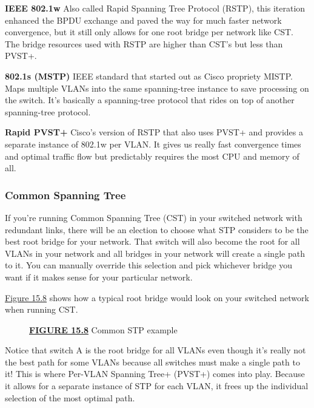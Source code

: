 \textbf{IEEE 802.1w} Also called Rapid Spanning Tree Protocol (RSTP),
this iteration enhanced the BPDU exchange and paved the way for much
faster network convergence, but it still only allows for one root bridge
per network like CST. The bridge resources used with RSTP are higher
than CST's but less than PVST+.

\textbf{802.1s (MSTP)} IEEE standard that started out as Cisco propriety
MISTP. Maps multiple VLANs into the same spanning-tree instance to save
processing on the switch. It's basically a spanning-tree protocol that
rides on top of another spanning-tree protocol.

\textbf{Rapid PVST+} Cisco's version of RSTP that also uses PVST+ and
provides a separate instance of 802.1w per VLAN. It gives us really fast
convergence times and optimal traffic flow but predictably requires the
most CPU and memory of all.

\subsubsection[Common Spanning
Tree]{\texorpdfstring{\protect\hypertarget{c15.xhtmlux5cux23c15-sec-13}{}{}Common
Spanning Tree}{Common Spanning Tree}}

If you're running Common Spanning Tree (CST) in your switched network
with redundant links, there will be an election to choose what STP
considers to be the best root bridge for your network. That switch will
also become the root for all VLANs in your network and all bridges in
your network will create a single path to it. You can manually override
this selection and pick whichever bridge you want if it makes sense for
your particular network.

\protect\hyperlink{c15.xhtmlux5cux23figure15-8}{Figure
15.8} shows how a typical root bridge would look on your switched
network when running CST.

\begin{figure}
\centering
\caption{{\protect\hyperlink{c15.xhtmlux5cux23figureanchor15-8}{\textbf{FIGURE
15.8}} Common STP example}}
\end{figure}

Notice that switch A is the root bridge for all VLANs even though it's
really not the best path for some VLANs because all switches must make a
single path to it! This is where Per-VLAN Spanning Tree+ (PVST+) comes
into play. Because it allows for a separate instance of STP for each
VLAN, it frees up the individual selection of the most optimal path.

